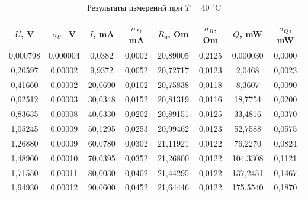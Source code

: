 \documentclass[a4paper,12pt]{article}
\begin{document}
\begin{table}[H]
    \centering
    \begin{tabular}{|c|c|c|c|c|c|c|c|}
    \hline
        $U$, V & $\sigma_U,$ V & $I$, mA & $\sigma_I$, mA & $R_н$, Om & $\sigma_R$, Om & $Q$, mW & $\sigma_Q$, mW \\ \hline
        0,000798 & 0,000004 & 0,0382 & 0,0002 & 20,89005 & 0,2125 & 0,000030 & 0,0000 \\ \hline
        0,20597 & 0,00002 & 9,9372 & 0,0052 & 20,72717 & 0,0123 & 2,0468 & 0,0023 \\ \hline
        0,41660 & 0,00002 & 20,0690 & 0,0102 & 20,75838 & 0,0118 & 8,3607 & 0,0090 \\ \hline
        0,62512 & 0,00003 & 30,0348 & 0,0152 & 20,81319 & 0,0116 & 18,7754 & 0,0200 \\ \hline
        0,83635 & 0,00008 & 40,0330 & 0,0202 & 20,89151 & 0,0125 & 33,4816 & 0,0370 \\ \hline
        1,05245 & 0,00009 & 50,1295 & 0,0253 & 20,99462 & 0,0123 & 52,7588 & 0,0575 \\ \hline
        1,26880 & 0,00009 & 60,0780 & 0,0302 & 21,11921 & 0,0122 & 76,2270 & 0,0824 \\ \hline
        1,48960 & 0,00010 & 70,0395 & 0,0352 & 21,26800 & 0,0122 & 104,3308 & 0,1121 \\ \hline
        1,71550 & 0,00011 & 80,0030 & 0,0402 & 21,44295 & 0,0122 & 137,2451 & 0,1467 \\ \hline
        1,94930 & 0,00012 & 90,0600 & 0,0452 & 21,64446 & 0,0122 & 175,5540 & 0,1870 \\ \hline
    \end{tabular}
    \caption{Результаты измерений при $T = 40$ $^\circ$C}
\end{table}
\end{document}
